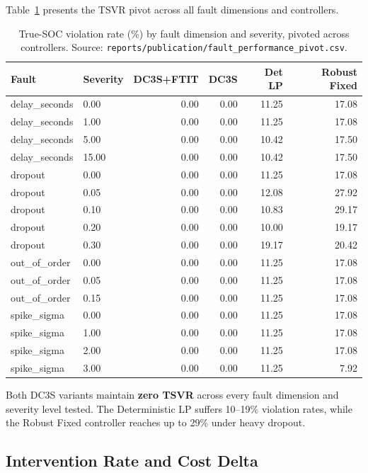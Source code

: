 Table~\ref{tab:fault-stress} presents the TSVR pivot across all fault
dimensions and controllers.

\begin{table}[ht]
\centering
\caption{True-SOC violation rate (\%) by fault dimension and severity,
  pivoted across controllers.  Source: \texttt{reports/publication/fault\_performance\_pivot.csv}.}
\label{tab:fault-stress}
\small
\begin{tabular}{llrrrr}
\toprule
\textbf{Fault} & \textbf{Severity} & \textbf{DC3S+FTIT} & \textbf{DC3S} &
  \textbf{Det LP} & \textbf{Robust Fixed} \\
\midrule
delay\_seconds & 0.00  & 0.00 & 0.00 & 11.25 & 17.08 \\
delay\_seconds & 1.00  & 0.00 & 0.00 & 11.25 & 17.08 \\
delay\_seconds & 5.00  & 0.00 & 0.00 & 10.42 & 17.50 \\
delay\_seconds & 15.00 & 0.00 & 0.00 & 10.42 & 17.50 \\
\midrule
dropout & 0.00 & 0.00 & 0.00 & 11.25 & 17.08 \\
dropout & 0.05 & 0.00 & 0.00 & 12.08 & 27.92 \\
dropout & 0.10 & 0.00 & 0.00 & 10.83 & 29.17 \\
dropout & 0.20 & 0.00 & 0.00 & 10.00 & 19.17 \\
dropout & 0.30 & 0.00 & 0.00 & 19.17 & 20.42 \\
\midrule
out\_of\_order & 0.00 & 0.00 & 0.00 & 11.25 & 17.08 \\
out\_of\_order & 0.05 & 0.00 & 0.00 & 11.25 & 17.08 \\
out\_of\_order & 0.15 & 0.00 & 0.00 & 11.25 & 17.08 \\
\midrule
spike\_sigma & 0.00 & 0.00 & 0.00 & 11.25 & 17.08 \\
spike\_sigma & 1.00 & 0.00 & 0.00 & 11.25 & 17.08 \\
spike\_sigma & 2.00 & 0.00 & 0.00 & 11.25 & 17.08 \\
spike\_sigma & 3.00 & 0.00 & 0.00 & 11.25 &  7.92 \\
\bottomrule
\end{tabular}
\end{table}

Both DC3S variants maintain \textbf{zero TSVR} across every fault
dimension and severity level tested.  The Deterministic LP suffers
10--19\% violation rates, while the Robust Fixed controller reaches
up to 29\% under heavy dropout.

\subsection{Intervention Rate and Cost Delta}

